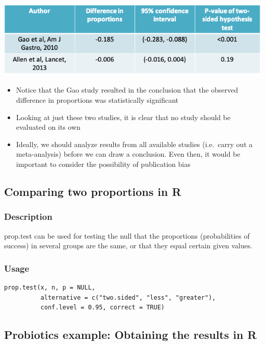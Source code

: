 \documentclass[
]{book}
\providecommand{\tightlist}{%
  \setlength{\itemsep}{0pt}\setlength{\parskip}{0pt}}
\begin{document}
\includegraphics[width=1\linewidth]{./7_54}

\begin{itemize}
\tightlist
\item
  Notice that the Gao study resulted in the conclusion that the observed difference in proportions was statistically significant
\item
  Looking at just these two studies, it is clear that no study should be evaluated on its own
\item
  Ideally, we should analyze results from all available studies (i.e.~carry out a meta-analysis) before we can draw a conclusion. Even then, it would be important to consider the possibility of publication bias
\end{itemize}

\hypertarget{comparing-two-proportions-in-r}{%
\subsection{Comparing two proportions in R}\label{comparing-two-proportions-in-r}}

\hypertarget{description}{%
\subsubsection{Description}\label{description}}

prop.test can be used for testing the null that the proportions (probabilities of success) in several groups are the same, or that they equal certain given values.

\hypertarget{usage}{%
\subsubsection{Usage}\label{usage}}

\begin{verbatim}
prop.test(x, n, p = NULL,
          alternative = c("two.sided", "less", "greater"),
          conf.level = 0.95, correct = TRUE)
\end{verbatim}

\hypertarget{probiotics-example-obtaining-the-results-in-r}{%
\subsection{Probiotics example: Obtaining the results in R}\label{probiotics-example-obtaining-the-results-in-r}}
\end{document}
